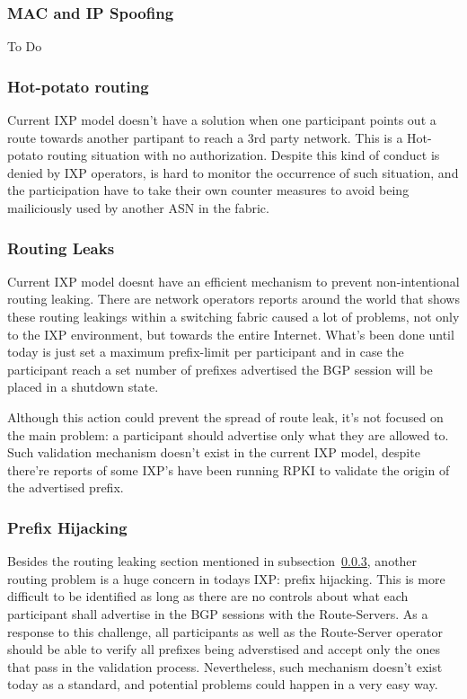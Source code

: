 \documentclass[conference]{IEEEtran/IEEEtran}
\begin{document}
\subsubsection{MAC and IP Spoofing}
To Do

\subsubsection{Hot-potato routing}
Current IXP model doesn't have a solution when one participant points out a route towards another partipant to reach a 3rd party network. This is a Hot-potato routing situation with no authorization. Despite this kind of conduct is denied by IXP operators, is hard to monitor the occurrence of such situation, and the participation have to take their own counter measures to avoid being mailiciously used by another ASN in the fabric.

\subsubsection{Routing Leaks}
\label{subsub:routingleak}
Current IXP model doesnt have an efficient mechanism to prevent non-intentional routing leaking. There are network operators reports around the world that shows these routing leakings within a switching fabric caused a lot of problems, not only to the IXP environment, but towards the entire Internet. What's been done until today is just set a maximum prefix-limit per participant and in case the participant reach a set number of prefixes advertised the BGP session will be placed in a shutdown state.

Although this action could prevent the spread of route leak, it's not focused on the main problem: a participant should advertise only what they are allowed to. Such validation mechanism doesn't exist in the current IXP model, despite there're reports of some IXP's have been running RPKI to validate the origin of the advertised prefix.

\subsubsection{Prefix Hijacking}
Besides the routing leaking section mentioned in subsection~\ref{subsub:routingleak}, another routing problem is a huge concern in todays IXP: prefix hijacking. This is more difficult to be identified as long as there are no controls about what each participant shall advertise in the BGP sessions with the Route-Servers. As a response to this challenge, all participants as well as the Route-Server operator should be able to verify all prefixes being adverstised and accept only the ones that pass in the validation process. Nevertheless, such mechanism doesn't exist today as a standard, and potential problems could happen in a very easy way.
\end{document}
